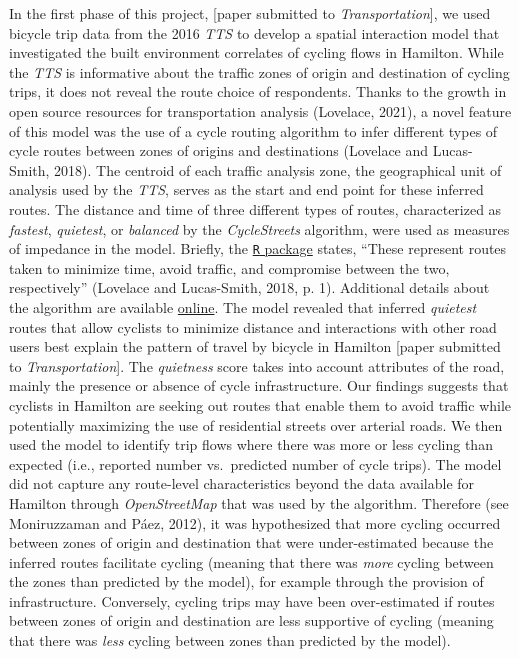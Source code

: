 \documentclass[]{elsarticle} %
\begin{document}
In the first phase of this project, {[}paper submitted to
\emph{Transportation}{]}, we used bicycle trip data from the 2016
\emph{TTS} to develop a spatial interaction model that investigated the
built environment correlates of cycling flows in Hamilton. While the
\emph{TTS} is informative about the traffic zones of origin and
destination of cycling trips, it does not reveal the route choice of
respondents. Thanks to the growth in open source resources for
transportation analysis (Lovelace, 2021), a novel feature of this model
was the use of a cycle routing algorithm to infer different types of
cycle routes between zones of origins and destinations (Lovelace and
Lucas-Smith, 2018). The centroid of each traffic analysis zone, the
geographical unit of analysis used by the \emph{TTS}, serves as the
start and end point for these inferred routes. The distance and time of
three different types of routes, characterized as \emph{fastest},
\emph{quietest}, or \emph{balanced} by the \emph{CycleStreets}
algorithm, were used as measures of impedance in the model. Briefly, the
\href{https://cran.r-project.org/web/packages/cyclestreets/index.html}{\texttt{R}
package} states, ``These represent routes taken to minimize time, avoid
traffic, and compromise between the two, respectively'' (Lovelace and
Lucas-Smith, 2018, p. 1). Additional details about the algorithm are
available
\href{https://www.cyclestreets.net/help/journey/howitworks/}{online}.
The model revealed that inferred \emph{quietest} routes that allow
cyclists to minimize distance and interactions with other road users
best explain the pattern of travel by bicycle in Hamilton {[}paper
submitted to \emph{Transportation}{]}. The \emph{quietness} score takes
into account attributes of the road, mainly the presence or absence of
cycle infrastructure. Our findings suggests that cyclists in Hamilton
are seeking out routes that enable them to avoid traffic while
potentially maximizing the use of residential streets over arterial
roads. We then used the model to identify trip flows where there was
more or less cycling than expected (i.e., reported number vs.~predicted
number of cycle trips). The model did not capture any route-level
characteristics beyond the data available for Hamilton through
\emph{OpenStreetMap} that was used by the algorithm. Therefore (see
Moniruzzaman and Páez, 2012), it was hypothesized that more cycling
occurred between zones of origin and destination that were
under-estimated because the inferred routes facilitate cycling (meaning
that there was \emph{more} cycling between the zones than predicted by
the model), for example through the provision of infrastructure.
Conversely, cycling trips may have been over-estimated if routes between
zones of origin and destination are less supportive of cycling (meaning
that there was \emph{less} cycling between zones than predicted by the
model).
\end{document}
